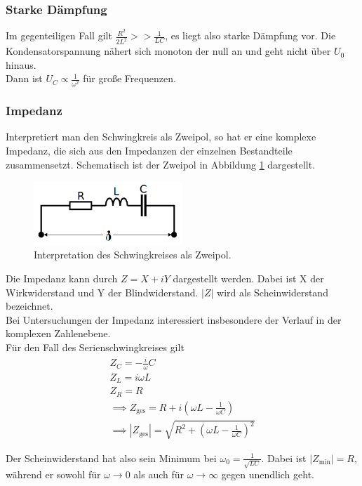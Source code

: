     \subsubsection{Starke Dämpfung}
        Im gegenteiligen Fall gilt $\frac{R^2}{2L^2} >> \frac{1}{LC}$, es liegt
        also starke Dämpfung vor. Die Kondensatorspannung nähert sich monoton
        der null an und geht nicht über $U_0$ hinaus. \\
        Dann ist $U_C \propto \frac{1}{\omega^2}$ für große Frequenzen.

    \subsubsection{Impedanz}
        Interpretiert man den Schwingkreis als Zweipol, so hat er eine komplexe
        Impedanz, die sich aus den Impedanzen der einzelnen Bestandteile zusammensetzt.
        Schematisch ist der Zweipol in Abbildung \ref{fig:zwei} dargestellt.
        \begin{figure}
            \centering
            \includegraphics[width=0.5\textwidth]{zweipol.png}
            \caption{Interpretation des Schwingkreises als Zweipol.\cite{anleitung}}
            \label{fig:zwei}
        \end{figure}

        \noindent Die Impedanz kann durch $Z = X + iY$ dargestellt werden. Dabei ist 
        X der Wirkwiderstand und Y der Blindwiderstand. $|Z|$ wird als Scheinwiderstand
        bezeichnet.\\
        Bei Untersuchungen der Impedanz interessiert insbesondere der Verlauf
        in der komplexen Zahlenebene.\\
        Für den Fall des Serienschwingkreises gilt
        \begin{align*}
            Z_C = -\frac{i}{\omega}{C}\\
            Z_L = i \omega L\\
            Z_R = R\\
            \implies Z_{\text{ges}} = R + i\left(\omega L - \frac{1}{\omega C}\right)\\
            \implies |Z_{\text{ges}}| = \sqrt{R^2 + \left(\omega L - \frac{1}{\omega C}\right)^2}
        \end{align*}

        \noindent Der Scheinwiderstand hat also sein Minimum bei $\omega_0 = \frac{1}{\sqrt{LC}}$.
        Dabei ist $|Z_{\text{min}}| = R$, während er sowohl für $\omega \to 0$ als auch
        für $\omega \to \infty$ gegen unendlich geht.
